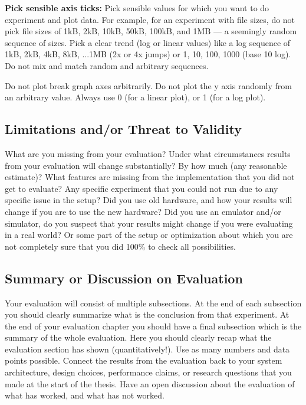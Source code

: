 \textbf{Pick sensible axis ticks:} Pick sensible values for which you want to do experiment and plot data. For example, for an experiment with file sizes, do not pick file sizes of 1kB, 2kB, 10kB, 50kB, 100kB, and 1MB --- a seemingly random sequence of sizes. Pick a clear trend (log or linear values) like  a log sequence of 1kB, 2kB, 4kB, 8kB, ...1MB (2x or 4x jumps) or 1, 10, 100, 1000 (base 10 log). Do not mix and match random and arbitrary sequences. 

Do not plot break graph axes arbitrarily. Do not plot the y axis randomly from an arbitrary value. Always use 0 (for a linear plot), or 1 (for a log plot).  

\subsection{Limitations and/or Threat to Validity}
What are you missing from your evaluation? Under what circumstances results from your evaluation will change substantially? By how much (any reasonable estimate)? What features are missing from the implementation that you did not get to evaluate? Any specific experiment that you could not run due to any specific issue in the setup? Did you use old hardware, and how your results will change if you are to use the new hardware? Did you use an emulator and/or simulator, do you suspect that your results might change if you were evaluating in a real world? Or some part of the setup or optimization about which you are not completely sure that you did 100\% to check all possibilities. 

\subsection{Summary or Discussion on Evaluation}
Your evaluation will consist of multiple subsections. At the end of each subsection you should clearly summarize what is the conclusion from that experiment. At the end of your evaluation chapter you should have a final subsection which is the summary of the whole evaluation. Here you should clearly recap what the evaluation section has shown (quantitatively!). Use as many numbers and data points possible. Connect the results from the evaluation back to your system architecture, design choices, performance claims, or research questions that you made at the start of the thesis. Have an open discussion about the evaluation of what has worked, and what has not worked. 


